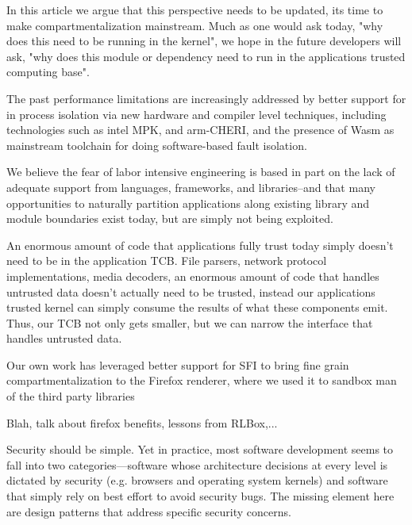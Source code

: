 In this article we argue that this perspective needs to be updated, its time
to make compartmentalization mainstream. Much as one would ask today, "why
does this need to be running in the kernel", we hope in the future developers
will ask, "why does this module or dependency need to run in the applications
trusted computing base".

The past performance limitations are increasingly addressed by better
support for in process isolation via new hardware and compiler
level techniques, including technologies such as intel MPK, and
arm-CHERI, and the presence of Wasm as mainstream toolchain for
doing software-based fault isolation.

We believe the fear of labor intensive engineering is based in part on the
lack of adequate support from languages, frameworks, and libraries--and
that many opportunities to naturally partition applications along existing
library and module boundaries exist today, but are simply not being exploited.

An enormous amount of code that applications fully trust today simply doesn't
need to be in the application TCB. File parsers, network protocol implementations,
media decoders, an enormous amount of code that handles untrusted data doesn't
actually need to be trusted, instead our applications trusted kernel can simply
consume the results of what these components emit. Thus, our TCB not only
gets smaller, but we can narrow the interface that handles untrusted data.

Our own work has leveraged better support for SFI to bring fine grain
compartmentalization to the Firefox renderer, where we used it to sandbox man
of the third party libraries 

Blah, talk about firefox benefits, lessons from RLBox,...





Security should be simple. Yet in practice, most software development seems to 
fall into two categories---software whose architecture decisions at every level 
is dictated by security (e.g. browsers and operating system kernels) and 
software that simply rely on best effort to avoid security bugs.
%
The missing element here are design patterns that address specific security 
concerns. 

